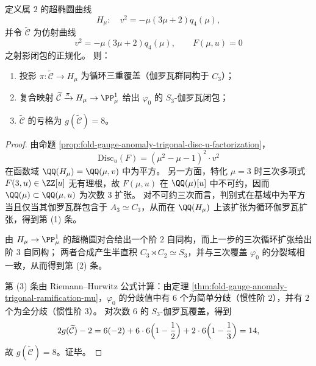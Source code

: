 \begin{theorem}\label{thm:fold-gauge-anomaly-trigonal-s3-galois-closure}
定义属 \(2\) 的超椭圆曲线
\[
H_\mu:\quad v^2=-\mu(3\mu+2)q_4(\mu),
\]
并令 \(\widetilde{\mathcal C}\) 为仿射曲线
\[
v^2=-\mu(3\mu+2)q_4(\mu),\qquad F(\mu,u)=0
\]
之射影闭包的正规化。
则：
\begin{enumerate}
  \item 投影 \(\pi:\widetilde{\mathcal C}\to H_\mu\) 为循环三重覆盖（伽罗瓦群同构于 \(C_3\)）；
  \item 复合映射 \(\widetilde{\mathcal C}\xrightarrow{\pi}H_\mu\to\PP^1_{\mu}\) 给出 \(\varphi_0\) 的 \(S_3\)-伽罗瓦闭包；
  \item \(\widetilde{\mathcal C}\) 的亏格为 \(g(\widetilde{\mathcal C})=8\)。
\end{enumerate}
\end{theorem}
\begin{proof}
由命题 \ref{prop:fold-gauge-anomaly-trigonal-disc-u-factorization}，
\[
\mathrm{Disc}_{u}(F)= (\mu^2-\mu-1)^2\cdot v^2
\]
在函数域 \(\QQ(H_\mu)=\QQ(\mu,v)\) 中为平方。
另一方面，特化 \(\mu=3\) 时三次多项式 \(F(3,u)\in\ZZ[u]\) 无有理根，故 \(F(\mu,u)\) 在 \(\QQ(\mu)[u]\) 中不可约，因而 \(\QQ(\mu)\subset\QQ(\mu,u)\) 为次数 \(3\) 扩张。
对不可约三次而言，判别式在基域中为平方当且仅当其伽罗瓦群包含于 \(A_3\simeq C_3\)，从而在 \(\QQ(H_\mu)\) 上该扩张为循环伽罗瓦扩张，得到第 (1) 条。
\par
由 \(H_\mu\to\PP^1_\mu\) 的超椭圆对合给出一个阶 \(2\) 自同构，而上一步的三次循环扩张给出阶 \(3\) 自同构；
两者合成产生半直积 \(C_3\rtimes C_2\simeq S_3\)，并与三次覆盖 \(\varphi_0\) 的分裂域相一致，从而得到第 (2) 条。
\par
第 (3) 条由 Riemann--Hurwitz 公式计算：由定理 \ref{thm:fold-gauge-anomaly-trigonal-ramification-mu}，\(\varphi_0\) 的分歧值中有 \(6\) 个为简单分歧（惯性阶 \(2\)），并有 \(2\) 个为全分歧（惯性阶 \(3\)）。
对次数 \(6\) 的 \(S_3\)-伽罗瓦覆盖，得到
\[
2g(\widetilde{\mathcal C})-2
=6(-2)+6\cdot 6\Bigl(1-\frac12\Bigr)+2\cdot 6\Bigl(1-\frac13\Bigr)
=14,
\]
故 \(g(\widetilde{\mathcal C})=8\)。证毕。
\end{proof}

